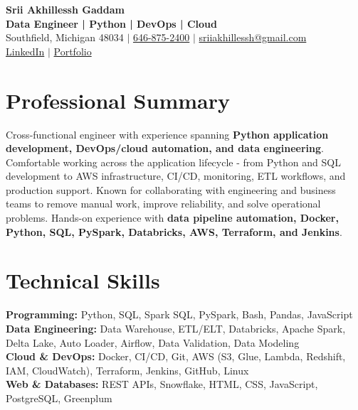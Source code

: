 \documentclass[letterpaper,10pt]{article}
\begin{document}
\fontsize{9.35pt}{10.45pt}\selectfont

\begin{center}
    {\LARGE \textbf{Srii Akhillessh Gaddam}} \\[-1pt]
    \textbf{Data Engineer | Python | DevOps | Cloud} \\[2pt]
    Southfield, Michigan 48034 $|$
    \href{tel:6468752400}{646-875-2400} $|$
    \href{mailto:sriiakhillessh@gmail.com}{sriiakhillessh@gmail.com} \\[1pt]
    \href{https://www.linkedin.com/in/srii-akhiilessh-gaddam-b48668191/}{LinkedIn} $|$
    \href{https://sriiakhillesshg.github.io/portfolio/}{Portfolio}
\end{center}
\vspace{-8pt}

\section{Professional Summary}
\small{Cross-functional engineer with experience spanning \textbf{Python application development, DevOps/cloud automation, and data engineering}. Comfortable working across the application lifecycle - from Python and SQL development to AWS infrastructure, CI/CD, monitoring, ETL workflows, and production support. Known for collaborating with engineering and business teams to remove manual work, improve reliability, and solve operational problems. Hands-on experience with \textbf{data pipeline automation, Docker, Python, SQL, PySpark, Databricks, AWS, Terraform, and Jenkins}.}

\section{Technical Skills}
\small{
\textbf{Programming:} Python, SQL, Spark SQL, PySpark, Bash, Pandas, JavaScript \\
\textbf{Data Engineering:} Data Warehouse, ETL/ELT, Databricks, Apache Spark, Delta Lake, Auto Loader, Airflow, Data Validation, Data Modeling \\
\textbf{Cloud \& DevOps:} Docker, CI/CD, Git, AWS (S3, Glue, Lambda, Redshift, IAM, CloudWatch), Terraform, Jenkins, GitHub, Linux \\
\textbf{Web \& Databases:} REST APIs, Snowflake, HTML, CSS, JavaScript, PostgreSQL, Greenplum
}
\end{document}
